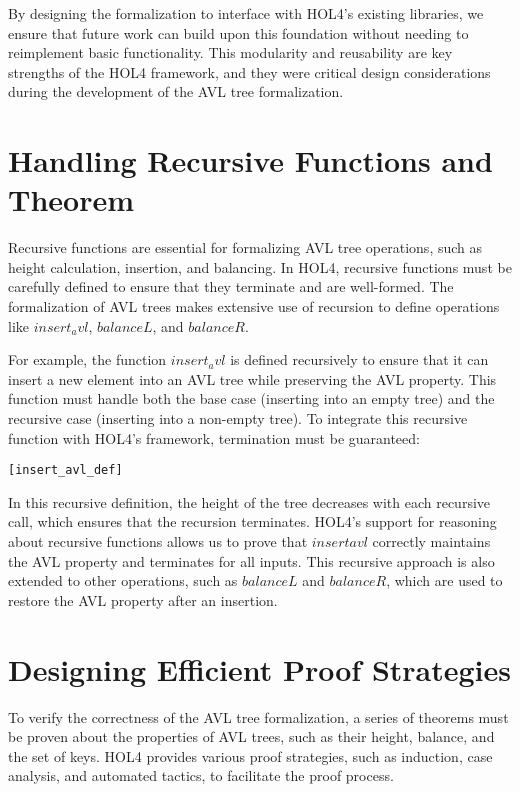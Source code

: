 By designing the formalization to interface with HOL4’s existing libraries, we ensure that future work can build upon this foundation without needing to reimplement basic functionality. This modularity and reusability are key strengths of the HOL4 framework, and they were critical design considerations during the development of the AVL tree formalization.

\section{Handling Recursive Functions and Theorem}

Recursive functions are essential for formalizing AVL tree operations, such as height calculation, insertion, and balancing. In HOL4, recursive functions must be carefully defined to ensure that they terminate and are well-formed. The formalization of AVL trees makes extensive use of recursion to define operations like \(insert_avl\), \(balanceL\), and \(balanceR\).

For example, the function \(insert_avl\) is defined recursively to ensure that it can insert a new element into an AVL tree while preserving the AVL property. This function must handle both the base case (inserting into an empty tree) and the recursive case (inserting into a non-empty tree). To integrate this recursive function with HOL4’s framework, termination must be guaranteed:

\begin{alltt}
	[insert_avl_def]
\end{alltt}

In this recursive definition, the height of the tree decreases with each recursive call, which ensures that the recursion terminates. HOL4’s support for reasoning about recursive functions allows us to prove that \(insert avl\) correctly maintains the AVL property and terminates for all inputs. This recursive approach is also extended to other operations, such as \(balanceL\) and \(balanceR\), which are used to restore the AVL property after an insertion.

\section{Designing Efficient Proof Strategies}

To verify the correctness of the AVL tree formalization, a series of theorems must be proven about the properties of AVL trees, such as their height, balance, and the set of keys. HOL4 provides various proof strategies, such as induction, case analysis, and automated tactics, to facilitate the proof process.

